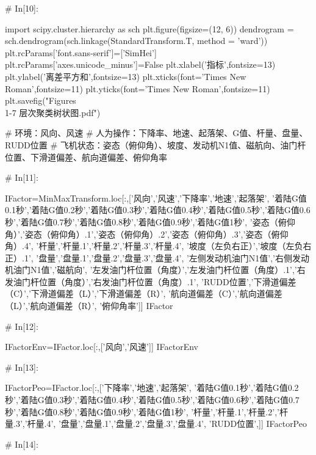 \documentclass{MathorCupModeling}
\begin{document}
\begin{python}
# In[10]:


import scipy.cluster.hierarchy as sch
plt.figure(figsize=(12, 6))
dendrogram = sch.dendrogram(sch.linkage(StandardTransform.T, method = 'ward'))
plt.rcParams['font.sans-serif']=['SimHei']
plt.rcParams['axes.unicode_minus']=False
plt.xlabel('指标',fontsize=13)
plt.ylabel('离差平方和',fontsize=13)
plt.xticks(font='Times New Roman',fontsize=11)
plt.yticks(font='Times New Roman',fontsize=11)
plt.savefig("Figures\\1-7 层次聚类树状图.pdf")


# 环境：风向、风速
# 人为操作：下降率、地速、起落架、G值、杆量、盘量、RUDD位置
# 飞机状态：姿态（俯仰角）、坡度、发动机N1值、磁航向、油门杆位置、下滑道偏差、航向道偏差、俯仰角率

# In[11]:


IFactor=MinMaxTransform.loc[:,['风向','风速','下降率','地速','起落架',
                               '着陆G值0.1秒','着陆G值0.2秒','着陆G值0.3秒','着陆G值0.4秒','着陆G值0.5秒','着陆G值0.6秒','着陆G值0.7秒','着陆G值0.8秒','着陆G值0.9秒','着陆G值1秒',
                               '姿态（俯仰角）','姿态（俯仰角）.1','姿态（俯仰角）.2','姿态（俯仰角）.3','姿态（俯仰角）.4',
                               '杆量','杆量.1','杆量.2','杆量.3','杆量.4',
                               '坡度（左负右正）','坡度（左负右正）.1',
                               '盘量','盘量.1','盘量.2','盘量.3','盘量.4',
                               '左侧发动机油门N1值','右侧发动机油门N1值','磁航向',
                               '左发油门杆位置（角度）','左发油门杆位置（角度）.1','右发油门杆位置（角度）','右发油门杆位置（角度）.1',
                               'RUDD位置','下滑道偏差（C）','下滑道偏差（L）','下滑道偏差（R）',
                               '航向道偏差（C）','航向道偏差（L）','航向道偏差（R）',
                               '俯仰角率']]
IFactor


# In[12]:


IFactorEnv=IFactor.loc[:,['风向','风速']]
IFactorEnv


# In[13]:


IFactorPeo=IFactor.loc[:,['下降率','地速','起落架',
                          '着陆G值0.1秒','着陆G值0.2秒','着陆G值0.3秒','着陆G值0.4秒','着陆G值0.5秒','着陆G值0.6秒','着陆G值0.7秒','着陆G值0.8秒','着陆G值0.9秒','着陆G值1秒',
                          '杆量','杆量.1','杆量.2','杆量.3','杆量.4',
                          '盘量','盘量.1','盘量.2','盘量.3','盘量.4',
                          'RUDD位置',]]
IFactorPeo


# In[14]:



\end{python}
\end{document}
